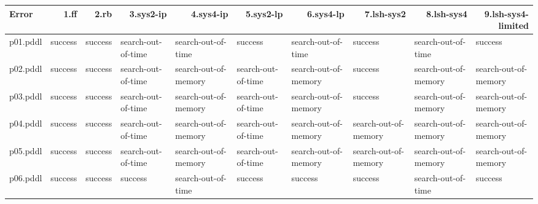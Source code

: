 \documentclass{article}
\begin{document}
\begin{tabular}{@{}lrrrrrrrrr@{}}
Error & 1.ff & 2.rb & 3.sys2-ip & 4.sys4-ip & 5.sys2-lp & 6.sys4-lp & 7.lsh-sys2 & 8.lsh-sys4 & 9.lsh-sys4-limited \\
\midrule
p01.pddl & \multicolumn{1}{|l|}{success} & \multicolumn{1}{|l|}{success} & \multicolumn{1}{|l|}{search-out-of-time} & \multicolumn{1}{|l|}{search-out-of-time} & \multicolumn{1}{|l|}{success} & \multicolumn{1}{|l|}{search-out-of-time} & \multicolumn{1}{|l|}{success} & \multicolumn{1}{|l|}{search-out-of-time} & \multicolumn{1}{|l|}{success} \\
p02.pddl & \multicolumn{1}{|l|}{success} & \multicolumn{1}{|l|}{success} & \multicolumn{1}{|l|}{search-out-of-time} & \multicolumn{1}{|l|}{search-out-of-memory} & \multicolumn{1}{|l|}{search-out-of-time} & \multicolumn{1}{|l|}{search-out-of-memory} & \multicolumn{1}{|l|}{success} & \multicolumn{1}{|l|}{search-out-of-memory} & \multicolumn{1}{|l|}{search-out-of-memory} \\
p03.pddl & \multicolumn{1}{|l|}{success} & \multicolumn{1}{|l|}{success} & \multicolumn{1}{|l|}{search-out-of-time} & \multicolumn{1}{|l|}{search-out-of-memory} & \multicolumn{1}{|l|}{search-out-of-time} & \multicolumn{1}{|l|}{search-out-of-memory} & \multicolumn{1}{|l|}{success} & \multicolumn{1}{|l|}{search-out-of-memory} & \multicolumn{1}{|l|}{search-out-of-memory} \\
p04.pddl & \multicolumn{1}{|l|}{success} & \multicolumn{1}{|l|}{success} & \multicolumn{1}{|l|}{search-out-of-time} & \multicolumn{1}{|l|}{search-out-of-memory} & \multicolumn{1}{|l|}{search-out-of-time} & \multicolumn{1}{|l|}{search-out-of-memory} & \multicolumn{1}{|l|}{search-out-of-memory} & \multicolumn{1}{|l|}{search-out-of-memory} & \multicolumn{1}{|l|}{search-out-of-memory} \\
p05.pddl & \multicolumn{1}{|l|}{success} & \multicolumn{1}{|l|}{success} & \multicolumn{1}{|l|}{search-out-of-time} & \multicolumn{1}{|l|}{search-out-of-memory} & \multicolumn{1}{|l|}{search-out-of-time} & \multicolumn{1}{|l|}{search-out-of-memory} & \multicolumn{1}{|l|}{search-out-of-memory} & \multicolumn{1}{|l|}{search-out-of-memory} & \multicolumn{1}{|l|}{search-out-of-memory} \\
p06.pddl & \multicolumn{1}{|l|}{success} & \multicolumn{1}{|l|}{success} & \multicolumn{1}{|l|}{success} & \multicolumn{1}{|l|}{search-out-of-time} & \multicolumn{1}{|l|}{success} & \multicolumn{1}{|l|}{success} & \multicolumn{1}{|l|}{success} & \multicolumn{1}{|l|}{search-out-of-time} & \multicolumn{1}{|l|}{success} \\

\end{tabular}
\end{document}

